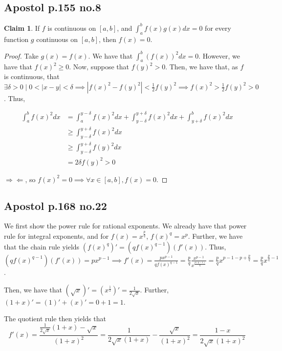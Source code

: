 \documentclass[12pt,letterpaper]{article}
\theoremstyle{definition}
\newtheorem*{claim}{Claim}
\newcommand{\contra}{\Rightarrow\!\Leftarrow}
\begin{document}
\subsection*{Apostol p.155 no.8}

\begin{claim}
  If $f$ is continuous on $[a,b]$, and $\int_a^bf(x)g(x)dx = 0$ for every
  function $g$ continuous on $[a,b]$, then $f(x) = 0$.
\end{claim}

\begin{proof}
  Take $g(x) = f(x)$. We have that $\int_a^b(f(x))^2dx = 0$. However, we have
  that $f(x)^2 \geq 0$. Now, suppose that $f(y)^2 > 0$. Then, we have that, as
  $f$ is continuous, that $\exists \delta > 0 \mid 0 < |x - y| < \delta \implies
  |f(x)^2 - f(y)^2| < \frac{1}{2}f(y)^2 \implies f(x)^2 > \frac{1}{2}f(y)^2 >
  0$. Thus,

  \begin{align*}
    \int_a^bf(x)^2dx &= \int_a^{y - \delta}f(x)^2dx + \int_{y - \delta}^{y+\delta}f(x)^2dx + \int_{y+\delta}^bf(x)^2dx \\
                     & \geq \int_{y - \delta}^{y+\delta}f(x)^2dx \\
                     & \geq \int_{y - \delta}^{y+\delta}f(y)^2dx \\
                     &= 2\delta f(y)^2> 0
  \end{align*}
  
  $\contra$, so $f(x)^2 = 0 \implies \forall x \in [a,b], f(x) = 0$.
\end{proof}

\subsection*{Apostol p.168 no.22}

We first show the power rule for rational exponents. We already have that power
rule for integral exponents, and for $f(x) = x^{\frac{p}{q}}$, $f(x)^q = x^p$.
Further, we have that the chain rule yields $(f(x)^q)' = (qf(x)^{q-1})(f'(x))$. Thus,
$(qf(x)^{q-1})(f'(x)) = px^{p-1} \implies f'(x) = \frac{px^{p-1}}{qf(x)^{q-1}} =
\frac{p}{q}\frac{x^{p-1}}{x^{\frac{p(q-1)}{q}}} = \frac{p}{q}x^{p- 1 - p +
  \frac{p}{q}} = \frac{p}{q}x^{\frac{p}{q} - 1}$.

Then, we have that $(\sqrt{x})' = (x^{\frac{1}{2}})' = \frac{1}{2\sqrt{x}}$.
Further, $(1 + x)' = (1)' + (x)' = 0 + 1 = 1$.

The quotient rule then yields that
\[
  f'(x) = \frac{\frac{1}{2\sqrt{x}}(1+x) - \sqrt{x}}{(1+x)^2}  =
  \frac{1}{2\sqrt{x}(1+x)} - \frac{\sqrt{x}}{(1+x)^2} = \frac{1-x}{2\sqrt{x}(1+x)^2}
\]
\end{document}
